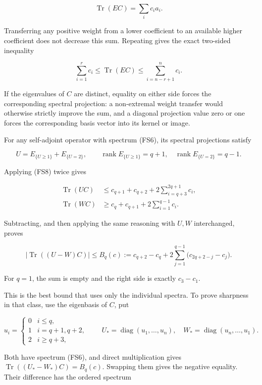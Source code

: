 \[
\operatorname{Tr}(EC)=\sum_i c_i a_i.
\]

Transferring any positive weight from a lower coefficient to an available higher coefficient does not decrease this sum. Repeating gives the exact two-sided inequality

\[
\sum_{i=1}^r c_i\le\operatorname{Tr}(EC)
\le\sum_{i=n-r+1}^n c_i.
\tag{FS8}
\]

If the eigenvalues of \(C\) are distinct, equality on either side forces the corresponding spectral projection: a non-extremal weight transfer would otherwise strictly improve the sum, and a diagonal projection value zero or one forces the corresponding basis vector into its kernel or image.

For any self-adjoint operator with spectrum (FS6), its spectral projections satisfy

\[
U=E_{\{U\ge1\}}+E_{\{U=2\}},
\qquad \operatorname{rank}E_{\{U\ge1\}}=q+1,
\quad\operatorname{rank}E_{\{U=2\}}=q-1.
\tag{FS9}
\]

Applying (FS8) twice gives

\[
\begin{aligned}
\operatorname{Tr}(UC)
&\le c_{q+1}+c_{q+2}+2\sum_{i=q+3}^{2q+1}c_i,\\
\operatorname{Tr}(WC)
&\ge c_q+c_{q+1}+2\sum_{i=1}^{q-1}c_i.
\end{aligned}
\tag{FS10}
\]

Subtracting, and then applying the same reasoning with \(U,W\) interchanged, proves

\[
\boxed{
\left|\operatorname{Tr}((U-W)C)\right|
\le B_q(c):=
c_{q+2}-c_q+
2\sum_{j=1}^{q-1}\bigl(c_{2q+2-j}-c_j\bigr).
}
\tag{FS11}
\]

For \(q=1\), the sum is empty and the right side is exactly \(c_3-c_1\).

This is the best bound that uses only the individual spectra. To prove sharpness in that class, use the eigenbasis of \(C\), put

\[
u_i=\begin{cases}
0&i\le q,\\1&i=q+1,q+2,\\2&i\ge q+3,
\end{cases}
\qquad
U_*=\operatorname{diag}(u_1,\ldots,u_n),
\quad W_*=\operatorname{diag}(u_n,\ldots,u_1).
\tag{FS12}
\]

Both have spectrum (FS6), and direct multiplication gives \(\operatorname{Tr}((U_*-W_*)C)=B_q(c)\). Swapping them gives the negative equality. Their difference has the ordered spectrum

